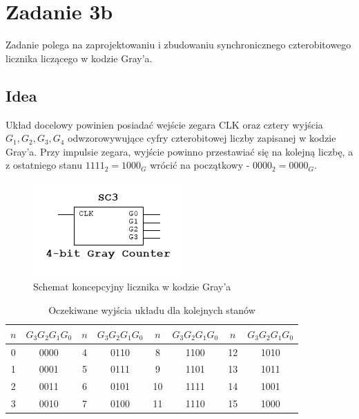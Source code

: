 \documentclass[12pt,a4paper,table]{article}
\begin{document}
    \pagebreak
    \section{Zadanie 3b}
    Zadanie polega na zaprojektowaniu i zbudowaniu synchronicznego czterobitowego licznika
    liczącego w kodzie Gray'a.

    \subsection{Idea}
    Układ docelowy powinien posiadać wejście zegara CLK oraz cztery wyjścia
    $G_1, G_2, G_3, G_4$ odwzorowywujące cyfry czterobitowej liczby zapisanej w kodzie Gray'a.
    Przy impulsie zegara, wyjście powinno przestawiać się na kolejną liczbę, a z ostatniego
    stanu $1111_2 = 1000_G$ wrócić na początkowy - $0000_2 = 0000_G$.

    \begin{figure}[h]
        \centering
        \includegraphics[]{images/gray_idea.PNG}
        \caption{Schemat koncepcyjny licznika w kodzie Gray'a}
        \label{fig:gray_idea}
    \end{figure}

    \begin{table}[h]
        \centering
        \begin{tabular}{|cc|cc|cc|cc|}
            \hline
            $n$ & $G_3G_2G_1G_0 $ & $n$ & $G_3G_2G_1G_0 $ & $n$ & $G_3G_2G_1G_0 $ & $n$ & $G_3G_2G_1G_0 $ \\
            \hline
            0 & 0000 & 4 & 0110 & 8  & 1100 & 12 & 1010 \\
            1 & 0001 & 5 & 0111 & 9  & 1101 & 13 & 1011 \\
            2 & 0011 & 6 & 0101 & 10 & 1111 & 14 & 1001 \\
            3 & 0010 & 7 & 0100 & 11 & 1110 & 15 & 1000 \\
            \hline
        \end{tabular}
        \caption{Oczekiwane wyjścia układu dla kolejnych stanów}
        \label{tab:gray_exp_output}
    \end{table}
\end{document}
